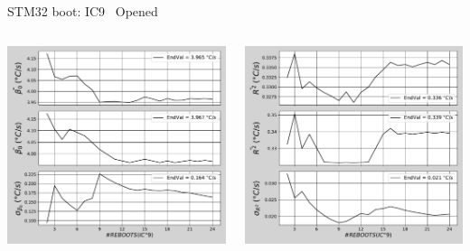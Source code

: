 \begin{frame}{STM32 boot: IC9 \textrightarrow\ Opened}
	\vspace{5mm}
	\begin{columns}
		\begin{column}{0.5\textwidth}
			\includegraphics[width=1.0\textwidth]{./figures/flistCircuit9_25_sl30beta0.pdf}
		\end{column}
		\begin{column}{0.5\textwidth}
			\includegraphics[width=1.0\textwidth]{./figures/flistCircuit9_25_sl30r2.pdf}
		\end{column}
	\end{columns}
\end{frame}

